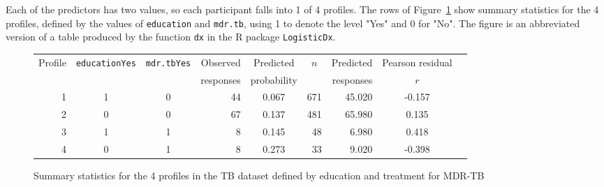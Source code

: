 Each of the predictors has two values, so each participant falls into 1 of 4 profiles.  The rows of Figure~\ref{figure:tbInterruptProfiles} show summary statistics for the 4 profiles, defined by the values of \texttt{education} and \texttt{mdr.tb}, using 1 to denote the level "Yes" and 0 for "No". The figure is an abbreviated version of a table produced by the function \texttt{dx} in the \textsf{R} package \texttt{LogisticDx}.

\begin{figure}[ht]
\centering
\begin{tabular}{rrrrrrrrr}
  \hline
 Profile &  \texttt{educationYes} & \texttt{mdr.tbYes} & Observed & \multicolumn{1}{c}{Predicted}  &
 \multicolumn{1}{c}{$n$} & Predicted & Pearson residual \\
 & & &  responses & \multicolumn{1}{c}{probability} & & responses & \multicolumn{1}{c}{$r$} \\
  \hline
1 & \multicolumn{1}{c}{1} & \multicolumn{1}{c}{0} &
 44 & \multicolumn{1}{c}{0.067} & 671 & 45.020 & \multicolumn{1}{c}{-0.157} \\
  2  & \multicolumn{1}{c}{0} & \multicolumn{1}{c}{0}
  & 67 & \multicolumn{1}{c}{0.137} & 481 & 65.980 & \multicolumn{1}{c}{0.135} \\
  3  & \multicolumn{1}{c}{1} & \multicolumn{1}{c}{1}
  & 8 & \multicolumn{1}{c}{0.145} & 48 & 6.980 & \multicolumn{1}{c}{0.418} \\
  4  & \multicolumn{1}{c}{0} & \multicolumn{1}{c}{1}
  & 8 & \multicolumn{1}{c}{0.273} & 33 & 9.020 & \multicolumn{1}{c}{-0.398} \\
   \hline
\end{tabular}
\caption{Summary statistics for the 4 profiles in the TB dataset
       defined by education and treatment for MDR-TB}
\label{figure:tbInterruptProfiles}
\end{figure}

